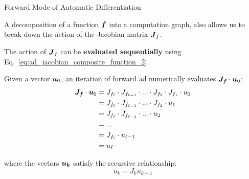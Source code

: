 %
%

\begin{frame}[t]{Forward Mode of Automatic Differentiation} 

  A decomposition of a function $\boldsymbol{f}$ 
  into a \gls{computation graph},
  also allows us to break down the action of the 
  \gls{Jacobian matrix} $\boldsymbol{J}_{f}$.\\
  \vspace{0.2cm}
    
  The action of $\boldsymbol{J}_{f}$
  can be {\bf evaluated sequentially} 
  using Eq.~\ref{eq:ad_jacobian_composite_function_2}.\\
  \vspace{0.2cm}

  Given a vector $\boldsymbol{u}_0$, an iteration of forward \gls{ad}
  numerically evaluates $\boldsymbol{J_f} \cdot \boldsymbol{u}_0$:\\    
  \vspace{-0.4cm}
  \begin{equation}
    \begin{split}
      \boldsymbol{J_f} \cdot \boldsymbol{u}_0 
      & = J_{f_{\ell}} \cdot J_{f_{\ell-1}} \cdot ... \cdot J_{f_2} \cdot J_{f_1} \cdot u_0 \\
      & = J_{f_{\ell}} \cdot J_{f_{\ell-1}} \cdot ... \cdot J_{f_2} \cdot u_1 \\
      & = J_{f_{\ell}} \cdot J_{f_{\ell-1}} \cdot ... \cdot u_2 \\
      & = ... \\
      & = J_{f_{\ell}} \cdot u_{\ell-1}  \\
      & = u_{\ell}  \\
    \end{split}
  \end{equation}
    
  where the vectors $\boldsymbol{u_k}$ satisfy the recursive relationship:\\
  \vspace{-0.3cm}
  \begin{equation}
    u_k = J_k u_{k-1} %
  \end{equation}
    
\end{frame}
  